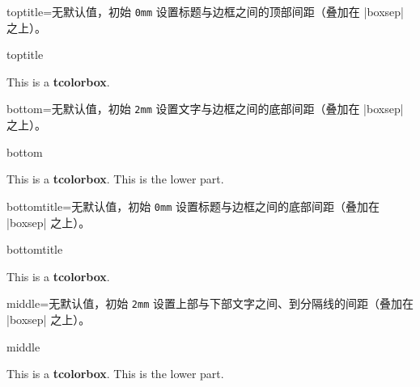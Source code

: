 \begin{docTcbKey}{toptitle}{=}{无默认值，初始 \texttt{0mm}}
  设置标题与边框之间的顶部间距（叠加在 |boxsep| 之上）。
\begin{exdispExample}{toptitle}

\begin{tcolorbox}[toptitle=3mm,title=My title]
This is a \textbf{tcolorbox}.
\end{tcolorbox}
\end{exdispExample}
\end{docTcbKey}

\clearpage
\begin{docTcbKey}{bottom}{=}{无默认值，初始 \texttt{2mm}}
  设置文字与边框之间的底部间距（叠加在 |boxsep| 之上）。
\begin{exdispExample}{bottom}

\begin{tcolorbox}[bottom=0mm]
This is a \textbf{tcolorbox}.
\tcblower
This is the lower part.
\end{tcolorbox}
\end{exdispExample}
\end{docTcbKey}

\begin{docTcbKey}{bottomtitle}{=}{无默认值，初始 \texttt{0mm}}
  设置标题与边框之间的底部间距（叠加在 |boxsep| 之上）。
\begin{exdispExample}{bottomtitle}

\begin{tcolorbox}[bottomtitle=3mm,title=My title]
This is a \textbf{tcolorbox}.
\end{tcolorbox}
\end{exdispExample}
\end{docTcbKey}


\begin{docTcbKey}{middle}{=}{无默认值，初始 \texttt{2mm}}
  设置上部与下部文字之间、到分隔线的间距（叠加在 |boxsep| 之上）。
\begin{exdispExample}{middle}

\begin{tcolorbox}[middle=0mm,boxsep=0mm]
This is a \textbf{tcolorbox}.
\tcblower
This is the lower part.
\end{tcolorbox}
\end{exdispExample}
\end{docTcbKey}



